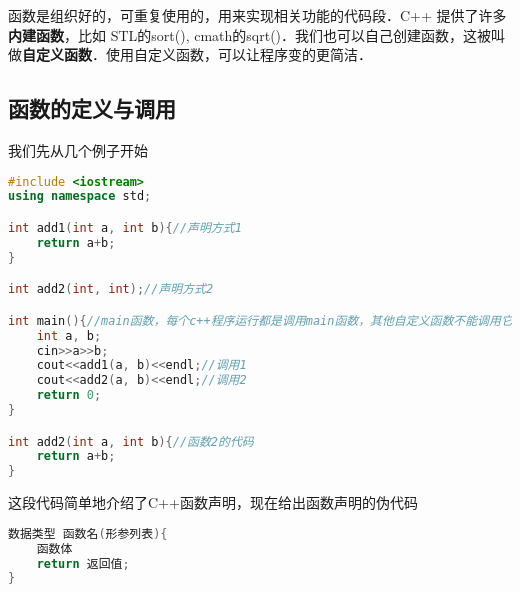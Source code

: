 
函数是组织好的，可重复使用的，用来实现相关功能的代码段．C++ 提供了许多\textbf{内建函数}，比如 STL的sort(), cmath的sqrt()．我们也可以自己创建函数，这被叫做\textbf{自定义函数}．使用自定义函数，可以让程序变的更简洁．

\subsection{函数的定义与调用}
我们先从几个例子开始
\begin{lstlisting}[language=cpp]
#include <iostream>
using namespace std;

int add1(int a, int b){//声明方式1
    return a+b;
}

int add2(int, int);//声明方式2

int main(){//main函数，每个c++程序运行都是调用main函数，其他自定义函数不能调用它
    int a, b;
    cin>>a>>b;
    cout<<add1(a, b)<<endl;//调用1
    cout<<add2(a, b)<<endl;//调用2
    return 0;
}

int add2(int a, int b){//函数2的代码
    return a+b;
}
\end{lstlisting}
这段代码简单地介绍了C++函数声明，现在给出函数声明的伪代码
\begin{lstlisting}[language=cpp]
数据类型 函数名(形参列表){
    函数体
    return 返回值;
}
\end{lstlisting}